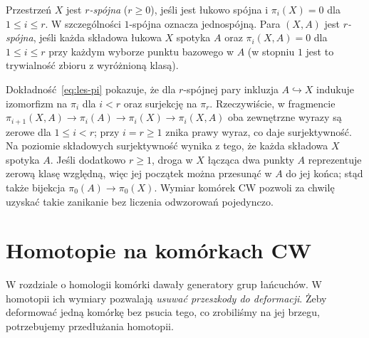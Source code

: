 \begin{definicja}
\label{def:spojnosc-homotopijna}
Przestrzeń $X$ jest
\emph{$r$-spójna} ($r\geq0$),
jeśli jest łukowo spójna
i $\pi_i(X)=0$ dla $1\leq i\leq r$.
W szczególności $1$-spójna
oznacza jednospójną.
Para $(X,A)$ jest
\emph{$r$-spójna}, jeśli
każda składowa łukowa $X$
spotyka $A$ oraz
$\pi_i(X,A)=0$ dla
$1\leq i\leq r$ przy każdym wyborze punktu bazowego w $A$
(w stopniu $1$ jest to
trywialność zbioru
z wyróżnioną klasą).
\end{definicja}

Dokładność~\eqref{eq:les-pi}
pokazuje, że dla $r$-spójnej
pary inkluzja $A\hookrightarrow X$
indukuje izomorfizm na
$\pi_i$ dla $i<r$ oraz
surjekcję na $\pi_r$.
Rzeczywiście, w fragmencie
$\pi_{i+1}(X,A)\to\pi_i(A)\to\pi_i(X)\to\pi_i(X,A)$
oba zewnętrzne wyrazy są zerowe dla $1\leq i<r$;
przy $i=r\geq1$ znika prawy wyraz, co daje surjektywność.
Na poziomie składowych surjektywność wynika z tego, że każda
składowa $X$ spotyka $A$. Jeśli dodatkowo $r\geq1$, droga w $X$
łącząca dwa punkty $A$ reprezentuje zerową klasę względną,
więc jej początek można przesunąć w $A$ do jej końca;
stąd także bijekcja $\pi_0(A)\to\pi_0(X)$.
Wymiar komórek CW pozwoli
za chwilę uzyskać takie
zanikanie bez liczenia odwzorowań
pojedynczo.

\section{Homotopie na komórkach CW}
\label{sec:pi-n-cw}

W rozdziale o homologii komórki dawały
generatory grup łańcuchów. W homotopii
ich wymiary pozwalają \emph{usuwać
przeszkody do deformacji}. Żeby
deformować jedną komórkę bez psucia
tego, co zrobiliśmy na jej brzegu,
potrzebujemy przedłużania homotopii.

